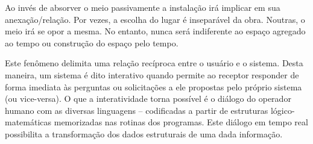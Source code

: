 Ao invés de absorver o meio passivamente a instalação irá implicar em sua anexação/relação.
Por vezes, a escolha do lugar é inseparável da obra. Noutras, o meio
irá se opor a mesma. No entanto, nunca será indiferente ao espaço agregado ao
tempo ou construção do espaço pelo tempo. \cite[p. 1130]{semeler2015}



Este fenômeno delimita uma relação recíproca entre o usuário e o sistema. Desta
maneira, um sistema é dito interativo quando permite ao receptor responder de forma
imediata às perguntas ou solicitações a ele propostas pelo próprio sistema (ou vice-versa). O que a interatividade torna possível é o diálogo do operador humano com as diversas linguagens – codificadas a partir de estruturas lógico-matemáticas memorizadas nas rotinas dos programas. Este diálogo em tempo real possibilita a transformação dos dados estruturais de uma dada informação. \cite{tavares}
